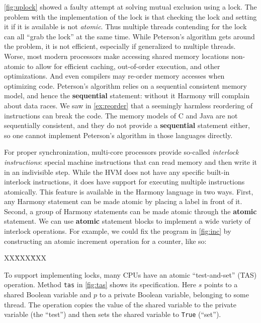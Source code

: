 \documentclass{report}
\newcommand{\harmonysource}[1]{
\begin{tabbing}
XX\=XXX\=XXX\kill
    
\end{tabbing}
}
\newenvironment{code}{
\tcolorbox
}{
\endtcolorbox
}
\begin{document}
\autoref{fig:uplock} showed a faulty attempt at solving mutual
exclusion using a lock.  The problem with the implementation of the
lock is that checking the lock and setting it if it is available is
not \emph{atomic}.  Thus multiple threads contending for the lock
can all ``grab the lock'' at the same time.  While Peterson's
algorithm gets around the problem, it is not efficient, especially
if generalized to multiple threads.
Worse, most modern processors make accessing shared memory locations
non-atomic to allow for efficient caching, out-of-order execution,
and other optimizations.
And even compilers may re-order memory accesses when optimizing code.
%
Peterson's algorithm relies on a sequential consistent memory model,
and hence the \textbf{sequential} statement: without it Harmony will
complain about data races.
We saw in \autoref{ex:reorder} that a seemingly harmless reordering
of instructions can break the code.
The memory models of C and Java are not sequentially consistent, and
they do not provide a \textbf{sequential} statement either, so one
cannot implement Peterson's algorithm in those languages directly.

%
For proper synchronization, multi-core processors provide so-called
\emph{interlock instructions}: %
special machine instructions
that can read memory and then write it in an indivisible step.
%
While the HVM does not have any specific built-in interlock instructions,
it does have support for executing multiple instructions atomically.
This feature is available in the Harmony language in two ways.
First, any Harmony statement can be made atomic by placing a label in front
of it.  Second, a group of Harmony statements can be made atomic
through the \textbf{atomic}
%
statement.
We can use \textbf{atomic} statement blocks to implement a wide variety of
interlock operations.
For example, we could fix the program in \autoref{fig:inc} by
constructing an atomic increment operation for a counter, like so:
\begin{code}
\harmonysource{atomicinc}
\end{code}

To support implementing locks,
many CPUs have an atomic ``test-and-set'' (TAS)
%
%
operation.
Method \texttt{tas} in \autoref{fig:tas} shows its specification.
Here $s$ points to a shared Boolean variable and $p$
to a private Boolean variable, belonging to some thread.
The operation copies the value of the shared variable to the
private variable (the ``test'')
and then sets the shared variable to \texttt{True} (``set'').
\end{document}
